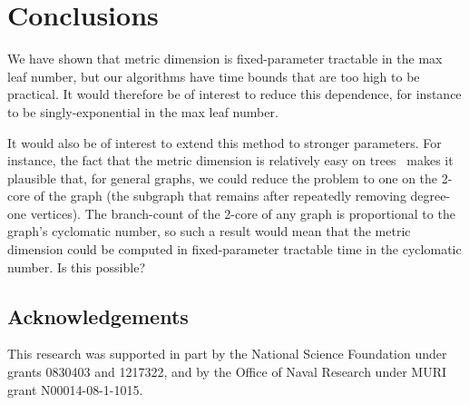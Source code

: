 \documentclass{jgaa-art}
\begin{document}
\section{Conclusions}

We have shown that metric dimension is fixed-parameter tractable in the max leaf number, but our algorithms have time bounds that are too high to be practical. It would therefore be of interest to reduce this dependence, for instance to be singly-exponential in the max leaf number.

It would also be of interest to extend this method to stronger parameters. For instance, the fact that the metric dimension is relatively easy on trees~\cite{HarMel-AC-76} makes it plausible that, for general graphs, we could reduce the problem to one on the 2-core of the graph (the subgraph that remains after repeatedly removing degree-one vertices). The branch-count of the 2-core of any graph is proportional to the graph's cyclomatic number, so such a result would mean that the metric dimension could be computed in fixed-parameter tractable time in the cyclomatic number. Is this possible?

\subsection*{Acknowledgements}
This research was supported in part  by the National Science Foundation under grants 0830403 and 1217322, and by the Office of Naval Research under MURI grant N00014-08-1-1015.

{\raggedright

}
\end{document}
